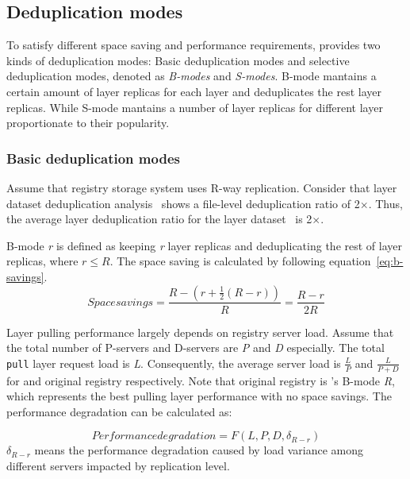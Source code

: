 \subsection{Deduplication modes}
\label{sec:dedup-mode}

To satisfy different space saving and performance requirements,
\sysname provides two kinds of deduplication modes:
Basic deduplication modes and selective deduplication modes, denoted as \emph{B-modes} and \emph{S-modes}.
B-mode mantains a certain amount of layer replicas for each layer and deduplicates the rest layer replicas.
While S-mode mantains a number of layer replicas for different layer proportionate to their popularity.

\subsubsection{Basic deduplication modes}
Assume that registry storage system uses R-way replication.
Consider that layer dataset deduplication analysis~\cite{xxx} shows a file-level deduplication ratio of 2$\times$.
Thus, the average layer deduplication ratio for the layer dataset~\cite{xxx} is 2$\times$.

B-mode \emph{r} is defined as keeping \emph{r} layer replicas and deduplicating the rest of layer replicas, where $r \leq R$. 
The space saving is calculated by following equation~\ref{eq:b-savings}.
\begin{equation}\label{eq:b-savings}
Space savings = \frac{R-(r+\frac{1}{2}(R-r))}{R} = \frac{R-r}{2R}
\end{equation}

Layer pulling performance largely depends on registry server load.
Assume that the total number of P-servers and D-servers are \emph{P} and \emph{D} especially.
The total \texttt{pull} layer request load is \emph{L}.
Consequently, the average server load is $\frac{L}{P}$ and $\frac{L}{P+D}$ for \sysname and original registry respectively.
Note that original registry is \sysname's B-mode \emph{R}, which represents the best pulling layer performance with no space savings.
The performance degradation can be calculated as:
 
 \begin{equation}\label{eq:c-pull}
Performance degradation =  F(L, P, D, \delta_{R-r})
 \end{equation}
 $\delta_{R-r}$ means the performance degradation caused by load variance among different servers impacted by replication level.

